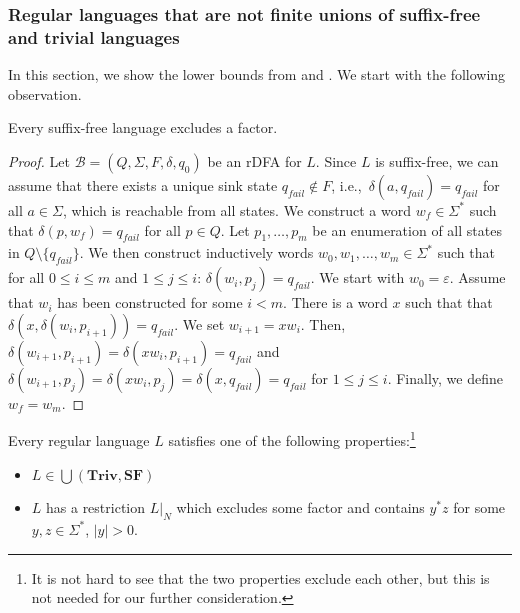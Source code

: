\documentclass{theoretics}
\newcommand{\B}{\mathcal{B}}
\newcommand{\Triv}{\mathbf{Triv}}
\newcommand{\SF}{\mathbf{SF}}
\newcommand{\eps}{\varepsilon}
\renewcommand{\leq}{\leqslant}
\begin{document}
\subsubsection{Regular languages that are not finite unions of suffix-free and trivial languages}
\label{sec-lb-union-nontriv-sf}

In this section, we show the lower bounds from  and .
We start with the following observation.


\begin{lemma}
	\label{lem:sf-ex}
	Every  suffix-free  language excludes a factor.
\end{lemma}

\begin{proof}
Let $\B=(Q,\Sigma,F,\delta,q_0)$ be an rDFA for $L$. Since $L$ is suffix-free,
we can assume that there exists a unique sink state $q_{\mathit{fail}} \notin F$,
i.e.,~$\delta(a, q_{\mathit{fail}}) = q_{\mathit{fail}}$ for all $a \in \Sigma$,
which is reachable from all states.
We construct a word $w_f \in \Sigma^*$ such that $\delta(p, w_f) = q_{\mathit{fail}}$ for all $p \in Q$.
Let $p_1, \ldots, p_m$ be an enumeration of all states in $Q \setminus \{q_{\mathit{fail}}\}$.
We then construct inductively words $w_0,w_1, \ldots, w_m \in \Sigma^*$ such that 
for all $0 \leq i \leq m$ and $1 \leq j \leq i$:  $\delta(w_i, p_j) = q_{\mathit{fail}}$.
We start with $w_0 = \eps$.
Assume that $w_i$ has been constructed for some $i < m$.
There is a word $x$ such that that $\delta( x, \delta(w_i, p_{i+1})) = q_{\mathit{fail}}$. We set $w_{i+1} = xw_i$.
Then, $\delta(w_{i+1}, p_{i+1}) = \delta(xw_i, p_{i+1})= q_{\mathit{fail}}$ and 
$\delta(w_{i+1},p_j) = \delta(xw_i,p_j)= \delta(x,q_{\mathit{fail}}) = q_{\mathit{fail}}$ for $1 \leq j \leq i$.
Finally, we define $w_f = w_m$.
\end{proof}

\begin{lemma}
\label{lem:not-sf}
Every regular language $L$ satisfies one of the following properties:\footnote{It is not hard to see that the two properties exclude each other, but this is not needed for our further
consideration.}
\begin{itemize}
\item $L \in \bigcup(\Triv, \SF)$ 
\item $L$ has a restriction $L|_N$ which excludes some factor
and contains $y^*z$ for some $y,z \in \Sigma^*$, $|y| > 0$.
\end{itemize}
\end{lemma}
\end{document}
